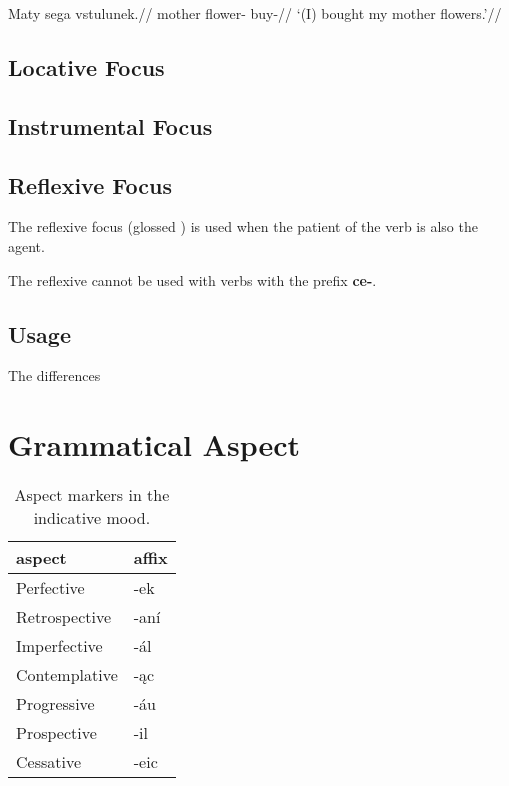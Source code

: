 \pex
\begingl
\gla Maty sega vstulunek.//
\glb mother flower- buy-//
\glft `(I) bought my mother flowers.'//
\endgl
\xe


\subsection{Locative Focus}

\subsection{Instrumental Focus}


\subsection{Reflexive Focus}

\par The reflexive focus (glossed ) is used when the patient of the verb is also the agent.

\par The reflexive cannot be used with verbs with the prefix \textbf{ce-}.

\subsection{Usage}

\par The differences 

\section{Grammatical Aspect}
\begin{table}[h!]
	\centering
	\caption{Aspect markers in the indicative mood.}
	\begin{tabu} to 0.8\textwidth{MM}
		\toprule
		{\sc aspect}	& {\sc affix}\\
		\midrule
		Perfective		& -ek\\
		Retrospective	& -an\'i\\
		Imperfective	& -\'al\\
		Contemplative	& -\k{a}c\\
		Progressive		& -\'au \\
		Prospective		& -il\\
		Cessative		& -eic\\
		\bottomrule
	\end{tabu}

\end{table}
